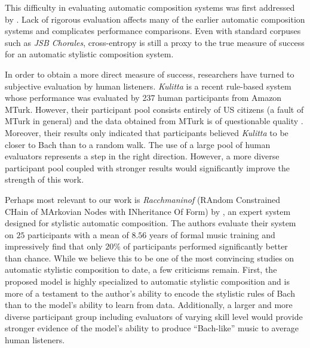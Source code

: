 This difficulty in evaluating automatic composition systems was first addressed
by \citet{pearce2001towards}. Lack of rigorous evaluation affects many of the
earlier automatic composition systems and complicates performance comparisons. Even
with standard corpuses such as \textit{JSB Chorales}, cross-entropy is still a proxy
to the true measure of success for an automatic stylistic composition system.

In order to obtain a more direct measure of success, researchers have turned to
subjective evaluation by human listeners. \textit{Kulitta}
\citep{quick2014kulitta} is a recent rule-based system whose performance was
evaluated by 237 human participants from Amazon MTurk. However, their
participant pool consists entirely of US citizens (a fault of MTurk in general)
and the data obtained from MTurk is of questionable quality
\citep{downs2010your}. Moreover, their results only indicated that participants
believed \textit{Kulitta} to be closer to Bach than to a random walk. The
use of a large pool of human evaluators represents a step in the right direction.
However, a more diverse participant pool coupled with stronger results would
significantly improve the strength of this work.

Perhaps most relevant to our work is \textit{Racchmaninof} (RAndom Constrained
CHain of MArkovian Nodes with INheritance Of Form) by
\citet{collins2016developing}, an expert system designed for stylistic
automatic composition. The authors evaluate their system on $25$ participants
with a mean of $8.56$ years of formal music training and impressively find that
only $20\%$ of participants performed significantly better than chance. While
we believe this to be one of the most convincing studies on automatic stylistic
composition to date, a few criticisms remain. First, the proposed model is
highly specialized to automatic stylistic composition and is more of a
testament to the author's ability to encode the stylistic rules of Bach than to
the model's ability to learn from data. Additionally, a larger and more diverse
participant group including evaluators of varying skill level would provide
stronger evidence of the model's ability to produce ``Bach-like'' music to
average human listeners.

